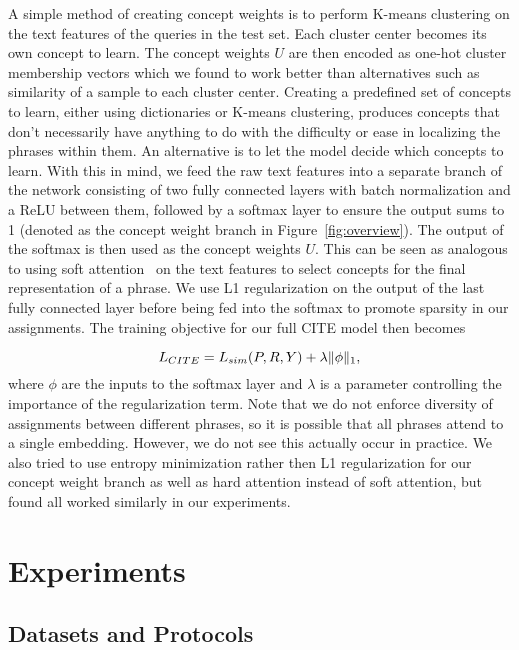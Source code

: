 \documentclass[runningheads]{llncs}
\DeclarePairedDelimiter{\norm}{\lVert}{\rVert}
\begin{document}
\smallskip{}  A simple method of creating concept weights is to perform K-means clustering on the text features of the queries in the test set.  Each cluster center becomes its own concept to learn.  The concept weights $U$ are then encoded as one-hot cluster membership vectors which we found to work better than alternatives such as similarity of a sample to each cluster center.
\smallskip{} Creating a predefined set of concepts to learn, either using dictionaries or K-means clustering, produces concepts that don't necessarily have anything to do with the difficulty or ease in localizing the phrases within them.  An alternative is to let the model decide which concepts to learn.  With this in mind, we feed the raw text features into a separate branch of the network consisting of two fully connected layers with batch normalization and a ReLU between them, followed by a softmax layer to ensure the output sums to 1 (denoted as the concept weight branch in Figure~\ref{fig:overview}).  The output of the softmax is then used as the concept weights $U$.  This can be seen as analogous to using soft attention~\cite{xu2015show} on the text features to select concepts for the final representation of a phrase.  We use L1 regularization on the output of the last fully connected layer before being fed into the softmax to promote sparsity in our assignments.  The training objective for our full CITE model then becomes

\begin{equation}
L_{CITE} = L_{sim}(P,R,Y) + \lambda\norm{\phi}_1,
\label{eq:final_loss}
\end{equation}\noindent where $\phi$ are the inputs to the softmax layer and $\lambda$ is a parameter controlling the importance of the regularization term.  Note that we do not enforce diversity of assignments between different phrases, so it is possible that all phrases attend to a single embedding.  However, we do not see this actually occur in practice.  We also tried to use entropy minimization rather then L1 regularization for our concept weight branch as well as hard attention instead of soft attention, but found all worked similarly in our experiments.


\section{Experiments}\label{sec:experiments}\subsection{Datasets and Protocols}
\end{document}
